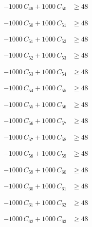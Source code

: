 \documentclass[a4paper,11pt]{article}
\begin{document}
\begin{align}
-1000\,C_{49} + 1000\,C_{50} &\geq 48 \nonumber
\end{align}

\begin{align}
-1000\,C_{50} + 1000\,C_{51} &\geq 48 \nonumber
\end{align}

\begin{align}
-1000\,C_{51} + 1000\,C_{52} &\geq 48 \nonumber
\end{align}

\begin{align}
-1000\,C_{52} + 1000\,C_{53} &\geq 48 \nonumber
\end{align}

\begin{align}
-1000\,C_{53} + 1000\,C_{54} &\geq 48 \nonumber
\end{align}

\begin{align}
-1000\,C_{54} + 1000\,C_{55} &\geq 48 \nonumber
\end{align}

\begin{align}
-1000\,C_{55} + 1000\,C_{56} &\geq 48 \nonumber
\end{align}

\begin{align}
-1000\,C_{56} + 1000\,C_{57} &\geq 48 \nonumber
\end{align}

\begin{align}
-1000\,C_{57} + 1000\,C_{58} &\geq 48 \nonumber
\end{align}

\begin{align}
-1000\,C_{58} + 1000\,C_{59} &\geq 48 \nonumber
\end{align}

\begin{align}
-1000\,C_{59} + 1000\,C_{60} &\geq 48 \nonumber
\end{align}

\begin{align}
-1000\,C_{60} + 1000\,C_{61} &\geq 48 \nonumber
\end{align}

\begin{align}
-1000\,C_{61} + 1000\,C_{62} &\geq 48 \nonumber
\end{align}

\begin{align}
-1000\,C_{62} + 1000\,C_{63} &\geq 48 \nonumber
\end{align}
\end{document}
